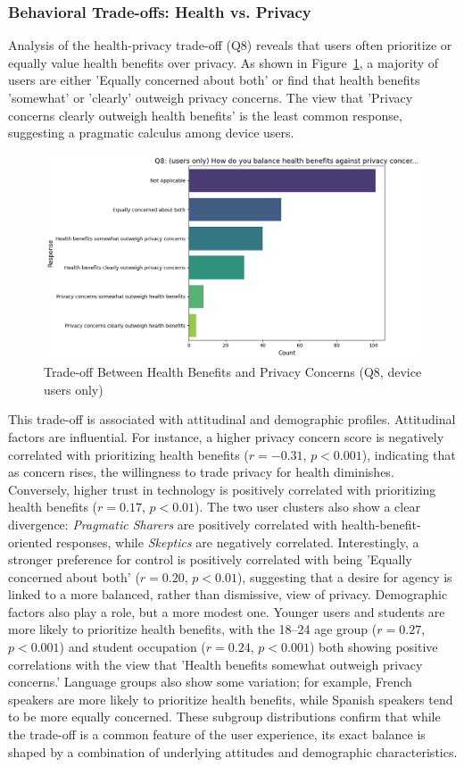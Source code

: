 	\subsubsection{Behavioral Trade-offs: Health vs. Privacy}
	Analysis of the health-privacy trade-off (Q8) reveals that users often prioritize or equally value health benefits over privacy. As shown in Figure~\ref{fig:Q8_tradeoff}, a majority of users are either 'Equally concerned about both' or find that health benefits 'somewhat' or 'clearly' outweigh privacy concerns. The view that 'Privacy concerns clearly outweigh health benefits' is the least common response, suggesting a pragmatic calculus among device users.
	\begin{figure}[ht]\centering
		\includegraphics[width=1\linewidth]{figures/questions/Q8_single_choice.png}
		\caption{Trade-off Between Health Benefits and Privacy Concerns (Q8, device users only)}
		\label{fig:Q8_tradeoff}
	\end{figure}
	This trade-off is associated with attitudinal and demographic profiles. Attitudinal factors are influential. For instance, a higher privacy concern score is negatively correlated with prioritizing health benefits ($r = -0.31$, $p < 0.001$), indicating that as concern rises, the willingness to trade privacy for health diminishes. Conversely, higher trust in technology is positively correlated with prioritizing health benefits ($r = 0.17$, $p < 0.01$). The two user clusters also show a clear divergence: \textit{Pragmatic Sharers} are positively correlated with health-benefit-oriented responses, while \textit{Skeptics} are negatively correlated. Interestingly, a stronger preference for control is positively correlated with being 'Equally concerned about both' ($r = 0.20$, $p < 0.01$), suggesting that a desire for agency is linked to a more balanced, rather than dismissive, view of privacy.
	Demographic factors also play a role, but a more modest one. Younger users and students are more likely to prioritize health benefits, with the 18--24 age group ($r = 0.27$, $p < 0.001$) and student occupation ($r = 0.24$, $p < 0.001$) both showing positive correlations with the view that 'Health benefits somewhat outweigh privacy concerns.' Language groups also show some variation; for example, French speakers are more likely to prioritize health benefits, while Spanish speakers tend to be more equally concerned. These subgroup distributions confirm that while the trade-off is a common feature of the user experience, its exact balance is shaped by a combination of underlying attitudes and demographic characteristics.
